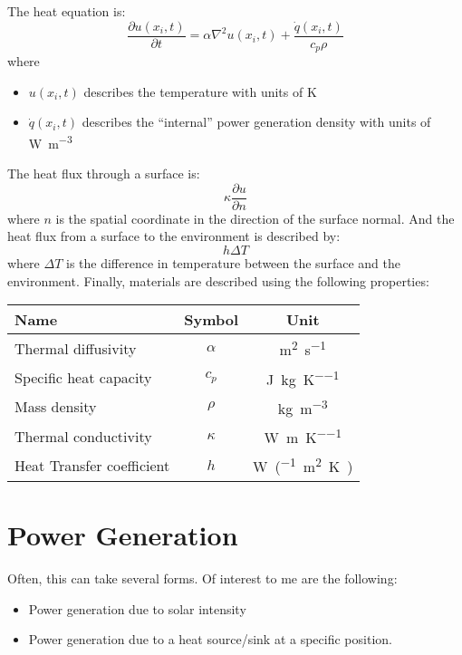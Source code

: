 \documentclass{article}
\begin{document}
\begin{tcolorbox}[title=In Summary]
  The heat equation is:
  \[
    \frac{\partial u(x_i,t)}{\partial t} = \alpha \nabla^2 u(x_i,t) + \frac{\dot{q}(x_i,t)}{c_p
      \rho}
  \]
  where
  \begin{itemize}
    \item $u(x_i,t)$ describes the temperature with units of \unit{\kelvin}
    \item $\dot{q}(x_i,t)$ describes the ``internal'' power generation density with units of
    \unit{\watt\per\meter^3}
  \end{itemize}
  The heat flux through a surface is:
  \[
    \kappa \frac{\partial u}{\partial n}
  \]
  where $n$ is the spatial coordinate in the direction of the surface normal. And the heat flux
  from a surface to the environment is described by:
  \[
    h\Delta T
  \]
  where $\Delta T$ is the difference in temperature between the surface and the
  environment. Finally, materials are described using the following properties:
  \begin{center}
    \begin{tabular}{lcc}
      \hline\hline
      Name &Symbol &Unit \\
      \hline
      Thermal diffusivity & $\alpha$ & \unit{\meter^2\per\second} \\
      Specific heat capacity & $c_p$ & \unit{\joule\per\kilo\gram\per\kelvin} \\
      Mass density & $\rho$ &\unit{\kilo\gram\per\meter^3} \\
      Thermal conductivity & $\kappa$ & \unit{\watt\per\meter\per\kelvin} \\
      Heat Transfer coefficient & $h$ & \unit{\watt\per(\meter^2\kelvin)} \\
      \hline\hline
    \end{tabular}
  \end{center}
\end{tcolorbox}

\section{Power Generation}
Often, this can take several forms. Of interest to me are the following:
\begin{itemize}
  \item Power generation due to solar intensity
  \item Power generation due to a heat source/sink at a specific position.
\end{itemize}
\end{document}
